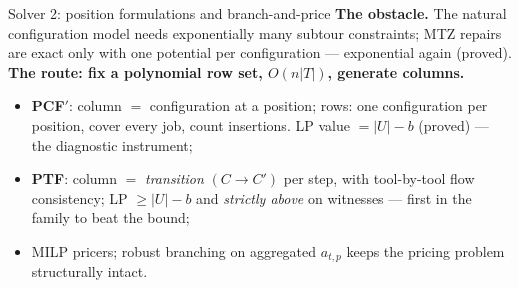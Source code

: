 \documentclass[10pt]{beamer}
\newcommand{\U}{U}\newcommand{\Kst}{K^{\ast}}\newcommand{\Zst}{Z^{\ast}}
\begin{document}
\begin{frame}{Solver 2: position formulations and branch-and-price}
\textbf{The obstacle.} The natural configuration model needs exponentially
many subtour constraints; MTZ repairs are exact only with one potential per
configuration --- exponential again (proved).\\[1mm]
\textbf{The route: fix a polynomial row set, $O(n|T|)$, generate columns.}
\begin{itemize}
  \item \textbf{PCF$'$}: column $=$ configuration at a position; rows: one
        configuration per position, cover every job, count insertions.
        LP value $=|\U|-b$ (proved) --- the diagnostic instrument;
  \item \textbf{PTF}: column $=$ \emph{transition} $(C\to C')$ per step, with
        tool-by-tool flow consistency; LP $\ge|\U|-b$ and \emph{strictly
        above} on witnesses --- first in the family to beat the bound;
  \item MILP pricers; robust branching on aggregated $a_{t,p}$ keeps the
        pricing problem structurally intact.
\end{itemize}
\end{frame}
\end{document}
